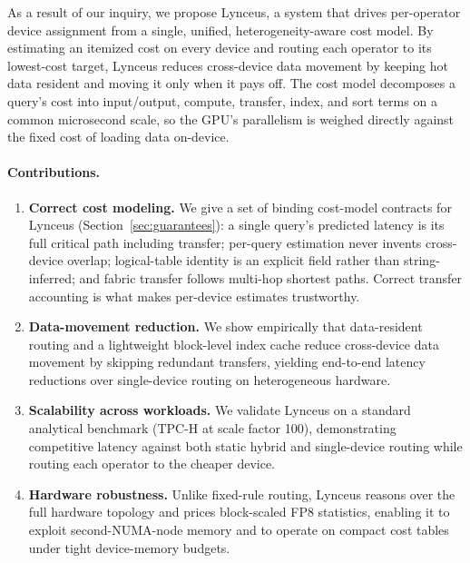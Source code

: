 \documentclass{article}
\begin{document}
As a result of our inquiry, we propose Lynceus, a system that drives per-operator
device assignment from a single, unified, heterogeneity-aware cost model. By
estimating an itemized cost on every device and routing each operator to its
lowest-cost target, Lynceus reduces cross-device data movement by keeping hot
data resident and moving it only when it pays off. The cost model decomposes a
query's cost into input/output, compute, transfer, index, and sort terms on a
common microsecond scale, so the GPU's parallelism is weighed directly against
the fixed cost of loading data on-device.

\paragraph{Contributions.}
\begin{enumerate}
    \item \textbf{Correct cost modeling.} We give a set of binding cost-model
    contracts for Lynceus (Section~\ref{sec:guarantees}): a single query's
    predicted latency is its full critical path including transfer; per-query
    estimation never invents cross-device overlap; logical-table identity is an
    explicit field rather than string-inferred; and fabric transfer follows
    multi-hop shortest paths. Correct transfer accounting is what makes
    per-device estimates trustworthy.

    \item \textbf{Data-movement reduction.} We show empirically that
    data-resident routing and a lightweight block-level index cache reduce
    cross-device data movement by skipping redundant transfers, yielding
    end-to-end latency reductions over single-device routing on heterogeneous
    hardware.

    \item \textbf{Scalability across workloads.} We validate Lynceus on a
    standard analytical benchmark (TPC-H at scale factor 100), demonstrating
    competitive latency against both static hybrid and single-device routing
    while routing each operator to the cheaper device.

    \item \textbf{Hardware robustness.} Unlike fixed-rule routing, Lynceus
    reasons over the full hardware topology and prices block-scaled FP8
    statistics, enabling it to exploit second-NUMA-node memory and to operate on
    compact cost tables under tight device-memory budgets.
\end{enumerate}
\end{document}
